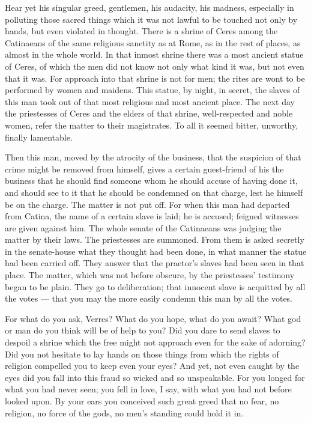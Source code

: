  Hear yet his singular greed, gentlemen, his audacity, his madness, especially in polluting those sacred things which it was not lawful to be touched not only by hands, but even violated in thought. There is a shrine of Ceres among the Catinaeans of the same religious sanctity as at Rome, as in the rest of places, as almost in the whole world. In that inmost shrine there was a most ancient statue of Ceres, of which the men did not know not only what kind it was, but not even that it was. For approach into that shrine is not for men; the rites are wont to be performed by women and maidens. This statue, by night, in secret, the slaves of this man took out of that most religious and most ancient place. The next day the priestesses of Ceres and the elders of that shrine, well-respected and noble women, refer the matter to their magistrates. To all it seemed bitter, unworthy, finally lamentable.

 Then this man, moved by the atrocity of the business, that the suspicion of that crime might be removed from himself, gives a certain guest-friend of his the business that he should find someone whom he should accuse of having done it, and should see to it that he should be condemned on that charge, lest he himself be on the charge. The matter is not put off. For when this man had departed from Catina, the name of a certain slave is laid; he is accused; feigned witnesses are given against him. The whole senate of the Catinaeans was judging the matter by their laws. The priestesses are summoned. From them is asked secretly in the senate-house what they thought had been done, in what manner the statue had been carried off. They answer that the praetor's slaves had been seen in that place. The matter, which was not before obscure, by the priestesses' testimony began to be plain. They go to deliberation; that innocent slave is acquitted by all the votes --- that you may the more easily condemn this man by all the votes.

 For what do you ask, Verres? What do you hope, what do you await? What god or man do you think will be of help to you? Did you dare to send slaves to despoil a shrine which the free might not approach even for the sake of adorning? Did you not hesitate to lay hands on those things from which the rights of religion compelled you to keep even your eyes? And yet, not even caught by the eyes did you fall into this fraud so wicked and so unspeakable. For you longed for what you had never seen; you fell in love, I say, with what you had not before looked upon. By your ears you conceived such great greed that no fear, no religion, no force of the gods, no men's standing could hold it in.

